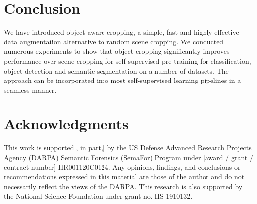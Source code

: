 \vspace{-5pt}
\section{Conclusion}
\vspace{-5pt}
We have introduced object-aware cropping, a simple, fast and highly effective data augmentation alternative to random scene cropping. We conducted numerous experiments to show that object cropping significantly improves performance over scene cropping for self-supervised pre-training for classification, object detection and semantic segmentation on a number of datasets. The approach can be incorporated into most self-supervised learning pipelines in a seamless manner. 
\label{sec:conclusion}




\section{Acknowledgments}
This work is supported[, in part,] by the US Defense Advanced Research Projects Agency (DARPA) Semantic Forensics (SemaFor) Program under [award / grant / contract number] HR001120C0124. Any opinions, findings, and conclusions or recommendations expressed in this material are those of the author and do not necessarily reflect the views of the DARPA. 
This research is also supported by the National Science Foundation under grant no. IIS-1910132.